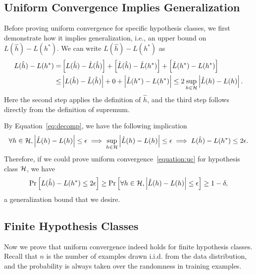 \documentclass[11pt]{article}
\begin{document}
\subsection{Uniform Convergence Implies Generalization}
	Before proving uniform convergence for specific hypothesis classes, we first demonstrate how it implies generalization, i.e., an upper bound on $L(\hat h) - L(h^*)$. We can write $L(\hat h) - L(h^*)$ as
	\begin{equation}\label{eq:decomp}\begin{split}
		L(\hat h) - L(h^*)
	=	&\left[L(\hat h) - \hat L(\hat h)\right] + \left[\hat L(\hat h) - \hat L(h^*)\right] + \left[\hat L(h^*) - L(h^*)\right]\\
	\le	&\left|L(\hat h) - \hat L(\hat h)\right| + 0 + \left|\hat L(h^*) - L(h^*)\right|
	\le	2\sup_{h \in \mathcal{H}}\left|\hat L(h) - L(h)\right|.
	\end{split}\end{equation}
	Here the second step applies the definition of $\hat h$, and the third step follows directly from the definition of supremum.

	By Equation~\eqref{eq:decomp}, we have the following implication
	\begin{equation}\label{eq:imp}
				\forall h \in \mathcal{H}, \left|\hat L(h) - L(h)\right| \le \epsilon
	\implies 	\sup_{h \in \mathcal{H}}\left|\hat L(h) - L(h)\right| \le \epsilon
	\implies 	L(\hat h) - L(h^*) \le 2\epsilon.
	\end{equation}
	Therefore, if we could prove uniform convergence~\eqref{equation:uc} for hypothesis class $\mathcal{H}$, we have
	\[
		\Pr\left[L(\hat h) - L(h^*) \le 2\epsilon\right]
	\ge	\Pr\left[\forall h \in \mathcal{H}, \left|\hat L(h) - L(h)\right| \le \epsilon\right]
	\ge	1 - \delta,
	\]
	a generalization bound that we desire.

\subsection{Finite Hypothesis Classes}
	Now we prove that uniform convergence indeed holds for finite hypothesis classes. Recall that $n$ is the number of examples drawn i.i.d. from the data distribution, and the probability is always taken over the randomness in training examples.
\end{document}
